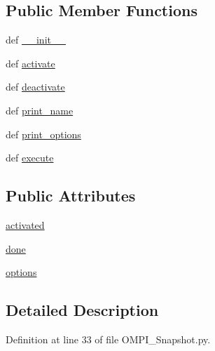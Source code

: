 \subsection*{Public Member Functions}
\begin{DoxyCompactItemize}
\item 
def \hyperlink{class_o_m_p_i___snapshot_1_1_o_m_p_i___snapshot_ab7795ea126dd1e33d4aa35e700fd0c14}{\-\_\-\-\_\-init\-\_\-\-\_\-}
\item 
def \hyperlink{class_o_m_p_i___snapshot_1_1_o_m_p_i___snapshot_a7adf04e52684ba6a4a9f0c2d9001bc4a}{activate}
\item 
def \hyperlink{class_o_m_p_i___snapshot_1_1_o_m_p_i___snapshot_a32a5364e9912d080292da1e56fe7f442}{deactivate}
\item 
def \hyperlink{class_o_m_p_i___snapshot_1_1_o_m_p_i___snapshot_ab7af9c3fc76ac8ac4a6776b40e50c9a6}{print\-\_\-name}
\item 
def \hyperlink{class_o_m_p_i___snapshot_1_1_o_m_p_i___snapshot_a7ce21ba8a546a75996c46e54196d51f4}{print\-\_\-options}
\item 
def \hyperlink{class_o_m_p_i___snapshot_1_1_o_m_p_i___snapshot_ae42ce34decdca8b8eb6a55f1fae6bce6}{execute}
\end{DoxyCompactItemize}
\subsection*{Public Attributes}
\begin{DoxyCompactItemize}
\item 
\hyperlink{class_o_m_p_i___snapshot_1_1_o_m_p_i___snapshot_a0e9ff636eea9c2e0593cc1e4f57c3b24}{activated}
\item 
\hyperlink{class_o_m_p_i___snapshot_1_1_o_m_p_i___snapshot_a6434d87ad221c54daecf11d8ad5604f8}{done}
\item 
\hyperlink{class_o_m_p_i___snapshot_1_1_o_m_p_i___snapshot_a1977ca5a7120bd199d1de101a0fb8c34}{options}
\end{DoxyCompactItemize}


\subsection{Detailed Description}


Definition at line 33 of file O\-M\-P\-I\-\_\-\-Snapshot.\-py.



